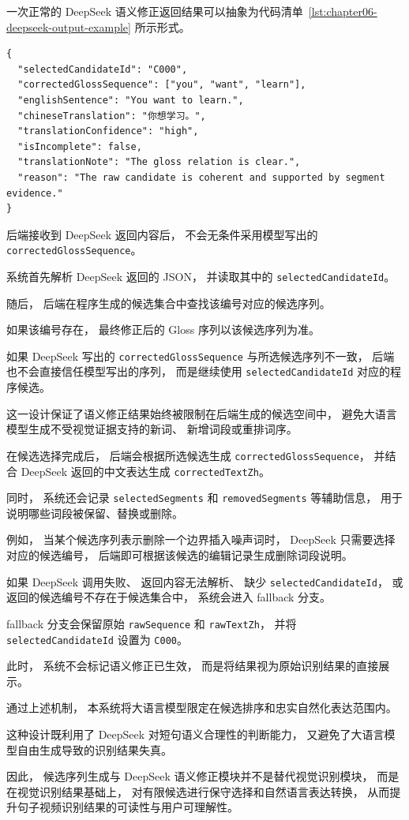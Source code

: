 一次正常的 DeepSeek 语义修正返回结果可以抽象为代码清单~\ref{lst:chapter06-deepseek-output-example} 所示形式。

\begin{lstlisting}[style=whuCode,caption={DeepSeek 语义修正返回结构示例},label={lst:chapter06-deepseek-output-example}]
{
  "selectedCandidateId": "C000",
  "correctedGlossSequence": ["you", "want", "learn"],
  "englishSentence": "You want to learn.",
  "chineseTranslation": "你想学习。",
  "translationConfidence": "high",
  "isIncomplete": false,
  "translationNote": "The gloss relation is clear.",
  "reason": "The raw candidate is coherent and supported by segment evidence."
}
\end{lstlisting}

后端接收到 DeepSeek 返回内容后，
不会无条件采用模型写出的 \texttt{correctedGlossSequence}。

系统首先解析 DeepSeek 返回的 JSON，
并读取其中的 \texttt{selectedCandidateId}。

随后，
后端在程序生成的候选集合中查找该编号对应的候选序列。

如果该编号存在，
最终修正后的 Gloss 序列以该候选序列为准。

如果 DeepSeek 写出的 \texttt{correctedGlossSequence} 与所选候选序列不一致，
后端也不会直接信任模型写出的序列，
而是继续使用 \texttt{selectedCandidateId} 对应的程序候选。

这一设计保证了语义修正结果始终被限制在后端生成的候选空间中，
避免大语言模型生成不受视觉证据支持的新词、
新增词段或重排词序。

在候选选择完成后，
后端会根据所选候选生成 \texttt{correctedGlossSequence}，
并结合 DeepSeek 返回的中文表达生成 \texttt{correctedTextZh}。

同时，
系统还会记录 \texttt{selectedSegments} 和 \texttt{removedSegments} 等辅助信息，
用于说明哪些词段被保留、替换或删除。

例如，
当某个候选序列表示删除一个边界插入噪声词时，
DeepSeek 只需要选择对应的候选编号，
后端即可根据该候选的编辑记录生成删除词段说明。

如果 DeepSeek 调用失败、
返回内容无法解析、
缺少 \texttt{selectedCandidateId}，
或返回的候选编号不存在于候选集合中，
系统会进入 fallback 分支。

fallback 分支会保留原始 \texttt{rawSequence} 和 \texttt{rawTextZh}，
并将 \texttt{selectedCandidateId} 设置为 \texttt{C000}。

此时，
系统不会标记语义修正已生效，
而是将结果视为原始识别结果的直接展示。

通过上述机制，
本系统将大语言模型限定在候选排序和忠实自然化表达范围内。

这种设计既利用了 DeepSeek 对短句语义合理性的判断能力，
又避免了大语言模型自由生成导致的识别结果失真。

因此，
候选序列生成与 DeepSeek 语义修正模块并不是替代视觉识别模块，
而是在视觉识别结果基础上，
对有限候选进行保守选择和自然语言表达转换，
从而提升句子视频识别结果的可读性与用户可理解性。